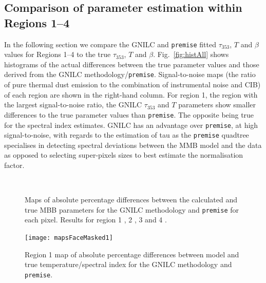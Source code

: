 \documentclass[a4paper,fleqn,usenatbib]{mnras}
\begin{document}
\subsection{Comparison of parameter estimation within Regions 1--4}

In the following section we compare the GNILC and {\texttt{premise}} fitted $\tau_{353}$, $T$ and $\beta$ values for Regions 1--4 to the true $\tau_{353}$, $T$ and $\beta$. Fig.~\ref{fig:histAll} shows histograms of the actual differences between the true parameter values and those derived from the GNILC methodology/{\texttt{premise}}. Signal-to-noise maps (the ratio of pure thermal dust emission to the combination of instrumental noise and CIB) of each region are shown in the right-hand column. For region 1, the region with the largest signal-to-noise ratio, the GNILC $\tau_{353}$ and $T$ parameters show smaller differences to the true parameter values than {\texttt{premise}}. The opposite being true for the spectral index estimates. GNILC has an advantage over {\texttt{premise}}, at high signal-to-noise, with regards to the estimation of tau as the {\texttt{premise}} quadtree specialises in detecting spectral deviations between the MMB model and the data as opposed to selecting super-pixels sizes to best estimate the normalisation factor.  

\begin{figure}
\centering
{}
\,
\caption{Maps of absolute percentage differences between the calculated and true MBB parameters for the GNILC methodology and {\texttt{premise}} for each pixel. Results for region 1 \protect{},  2 \protect{}, 3 \protect{} and 4 \protect{}.}
\label{fig:mapsAll}
\end{figure}

\begin{figure}
	\centering
	\texttt{[image: mapsFaceMasked1]}
	\caption{Region 1 map of absolute percentage differences between model and true temperature/spectral index for the GNILC methodology and {\texttt{premise}}.}
	\label{fig:pointMap}
\end{figure}
\end{document}
